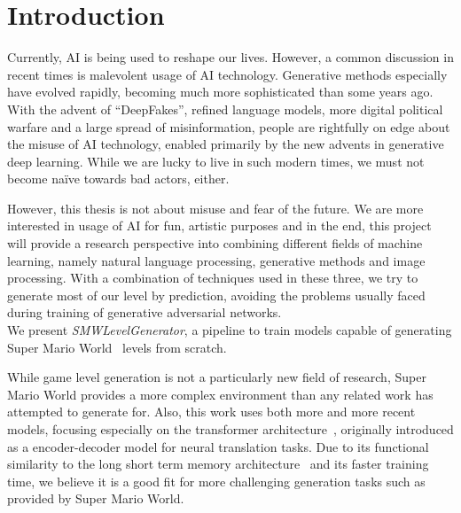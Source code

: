 \section{Introduction}

Currently, AI is being used to reshape our lives. However, a common
discussion in recent times is malevolent usage of AI technology.
Generative methods especially have evolved rapidly, becoming much more
sophisticated than some years ago. With the advent of ``DeepFakes'',
refined language models, more digital political warfare and a large
spread of misinformation, people are rightfully on edge about the
misuse of AI technology, enabled primarily by the new advents in
generative deep learning. While we are lucky to live in such modern
times, we must not become naïve towards bad actors, either.

However, this thesis is not about misuse and fear of the future. We
are more interested in usage of AI for fun, artistic purposes and in
the end, this project will provide a research perspective into
combining different fields of machine learning, namely natural
language processing, generative methods and image processing. With a
combination of techniques used in these three, we try to generate most
of our level by prediction, avoiding the problems usually faced during
training of generative adversarial networks. \\
We present \emph{SMWLevelGenerator}, a pipeline to train models
capable of generating Super Mario World~\cite{SuperMarioWorld2019}
levels from scratch.

While game level generation is not a particularly new field of
research, Super Mario World provides a more complex environment than
any related work has attempted to generate for. Also, this work uses
both more and more recent models, focusing especially on the
transformer architecture~\cite{vaswaniAttentionAllYou2017}, originally
introduced as a encoder-decoder model for neural translation tasks.
Due to its functional similarity to the long short term memory
architecture~\cite{hochreiterLongShorttermMemory1997} and its faster
training time, we believe it is a good fit for more challenging
generation tasks such as provided by Super Mario World.



